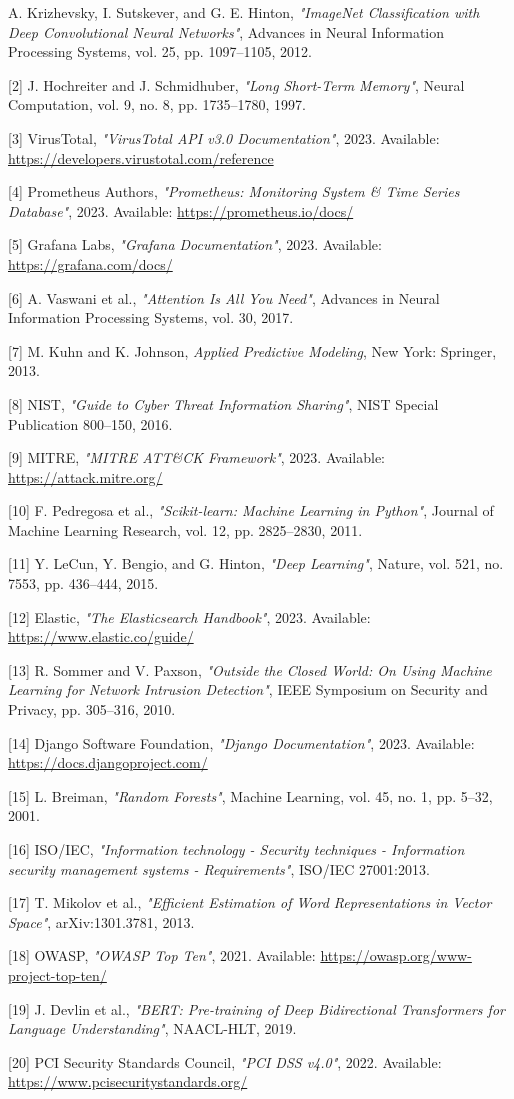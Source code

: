 \documentclass[12pt]{article}
\begin{document}
{\fontsize{8}{10}\selectfont
[1] A. Krizhevsky, I. Sutskever, and G. E. Hinton, \textit{"ImageNet Classification with Deep Convolutional Neural Networks"}, Advances in Neural Information Processing Systems, vol. 25, pp. 1097--1105, 2012.

[2] J. Hochreiter and J. Schmidhuber, \textit{"Long Short-Term Memory"}, Neural Computation, vol. 9, no. 8, pp. 1735--1780, 1997.

[3] VirusTotal, \textit{"VirusTotal API v3.0 Documentation"}, 2023. Available: \url{https://developers.virustotal.com/reference}

[4] Prometheus Authors, \textit{"Prometheus: Monitoring System \& Time Series Database"}, 2023. Available: \url{https://prometheus.io/docs/}

[5] Grafana Labs, \textit{"Grafana Documentation"}, 2023. Available: \url{https://grafana.com/docs/}

[6] A. Vaswani et al., \textit{"Attention Is All You Need"}, Advances in Neural Information Processing Systems, vol. 30, 2017.

[7] M. Kuhn and K. Johnson, \textit{Applied Predictive Modeling}, New York: Springer, 2013.

[8] NIST, \textit{"Guide to Cyber Threat Information Sharing"}, NIST Special Publication 800--150, 2016.

[9] MITRE, \textit{"MITRE ATT\&CK Framework"}, 2023. Available: \url{https://attack.mitre.org/}

[10] F. Pedregosa et al., \textit{"Scikit-learn: Machine Learning in Python"}, Journal of Machine Learning Research, vol. 12, pp. 2825--2830, 2011.

[11] Y. LeCun, Y. Bengio, and G. Hinton, \textit{"Deep Learning"}, Nature, vol. 521, no. 7553, pp. 436--444, 2015.

[12] Elastic, \textit{"The Elasticsearch Handbook"}, 2023. Available: \url{https://www.elastic.co/guide/}

[13] R. Sommer and V. Paxson, \textit{"Outside the Closed World: On Using Machine Learning for Network Intrusion Detection"}, IEEE Symposium on Security and Privacy, pp. 305--316, 2010.

[14] Django Software Foundation, \textit{"Django Documentation"}, 2023. Available: \url{https://docs.djangoproject.com/}

[15] L. Breiman, \textit{"Random Forests"}, Machine Learning, vol. 45, no. 1, pp. 5--32, 2001.

[16] ISO/IEC, \textit{"Information technology - Security techniques - Information security management systems - Requirements"}, ISO/IEC 27001:2013.

[17] T. Mikolov et al., \textit{"Efficient Estimation of Word Representations in Vector Space"}, arXiv:1301.3781, 2013.

[18] OWASP, \textit{"OWASP Top Ten"}, 2021. Available: \url{https://owasp.org/www-project-top-ten/}

[19] J. Devlin et al., \textit{"BERT: Pre-training of Deep Bidirectional Transformers for Language Understanding"}, NAACL-HLT, 2019.

[20] PCI Security Standards Council, \textit{"PCI DSS v4.0"}, 2022. Available: \url{https://www.pcisecuritystandards.org/}
}
\end{document}
